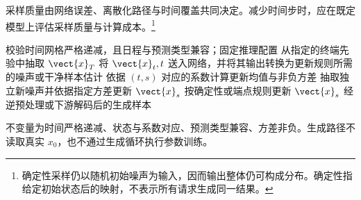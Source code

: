 \documentclass[../textbook.tex]{subfiles}
\begin{document}
采样质量由网络误差、离散化路径与时间覆盖共同决定。减少时间步时，应在既定模型上评估采样质量与计算成本。\footnote{确定性采样仍以随机初始噪声为输入，因而输出整体仍可构成分布。确定性指给定初始状态后的映射，不表示所有请求生成同一结果。}

\begin{algorithm}[反向生成]
\begin{myalgorithmic}[1]
\State 校验时间网格严格递减，且日程与预测类型兼容；固定推理配置
\State 从指定的终端先验中抽取 $\vect{x}_T$
  \State 将 $\vect{x}_t,t$ 送入网络，并将其输出转换为更新规则所需的噪声或干净样本估计
  \State 依据 $(t,s)$ 对应的系数计算更新均值与非负方差
    \State 抽取独立新噪声并依据指定方差更新 $\vect{x}_s$
  \Else
    \State 按确定性或端点规则更新 $\vect{x}_s$
  \EndIf
\EndFor
\State \Return 经逆预处理或下游解码后的生成样本
\end{myalgorithmic}
不变量为时间严格递减、状态与系数对应、预测类型兼容、方差非负。生成路径不读取真实 $x_0$，也不通过生成循环执行参数训练。
\end{algorithm}
\end{document}
